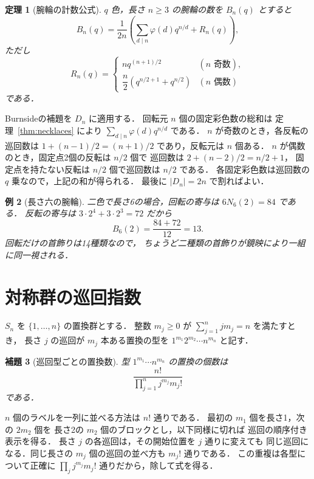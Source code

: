 \documentclass[a5paper,10pt,onecolumn]{jsarticle}
\makeatletter
\theoremstyle{mathnotetheorem}
\newtheorem{theorem}{定理}[section]
\newtheorem{lemma}[theorem]{補題}
\newtheorem{example}[theorem]{例}
\renewcommand{\proofname}{証明}
\renewenvironment{proof}[1][\proofname]{%
  \par\pushQED{\qed}\normalfont\topsep4\p@\@plus2\p@\relax
  \trivlist\item[\hskip\labelsep\bfseries #1]\ignorespaces
}{\popQED\endtrivlist\@endpefalse}
\makeatother
\begin{document}
\begin{theorem}[腕輪の計数公式]\label{thm:bracelets}
$q$ 色，長さ $n\ge3$ の腕輪の数を $B_n(q)$ とすると
\[
 B_n(q)=\frac1{2n}\left(
 \sum_{d\mid n}\varphi(d)q^{n/d}+R_n(q)\right),
\]
ただし
\[
 R_n(q)=\begin{cases}
 nq^{(n+1)/2}& (n\text{ 奇数}),\\
 \dfrac n2\left(q^{n/2+1}+q^{n/2}\right)
 &(n\text{ 偶数})
 \end{cases}
\]
である．
\end{theorem}
\begin{proof}
Burnsideの補題を $D_n$ に適用する．
回転元 $n$ 個の固定彩色数の総和は
定理~\ref{thm:necklaces} により
$\sum_{d\mid n}\varphi(d)q^{n/d}$ である．
$n$ が奇数のとき，各反転の巡回数は
$1+(n-1)/2=(n+1)/2$ であり，反転元は $n$ 個ある．
$n$ が偶数のとき，固定点2個の反転は $n/2$ 個で
巡回数は $2+(n-2)/2=n/2+1$，
固定点を持たない反転は $n/2$ 個で巡回数は $n/2$ である．
各固定彩色数は巡回数の $q$ 乗なので，上記の和が得られる．
最後に $|D_n|=2n$ で割ればよい．
\end{proof}

\begin{example}[長さ六の腕輪]
二色で長さ6の場合，回転の寄与は $6N_6(2)=84$ である．
反転の寄与は
$3\cdot2^4+3\cdot2^3=72$ だから
\[
 B_6(2)=\frac{84+72}{12}=13.
\]
回転だけの首飾りは14種類なので，
ちょうど二種類の首飾りが鏡映により一組に同一視される．
\end{example}

\section{対称群の巡回指数}
$S_n$ を $\{1,\ldots,n\}$ の置換群とする．
整数 $m_j\ge0$ が $\sum_{j=1}^n j m_j=n$ を満たすとき，
長さ $j$ の巡回が $m_j$ 本ある置換の型を
$1^{m_1}2^{m_2}\cdots n^{m_n}$ と記す．

\begin{lemma}[巡回型ごとの置換数]\label{lem:cycletypes}
型 $1^{m_1}\cdots n^{m_n}$ の置換の個数は
\begin{equation}\label{eq:permutationcount}
 \frac{n!}{\prod_{j=1}^n j^{m_j}m_j!}
\end{equation}
である．
\end{lemma}
\begin{proof}
$n$ 個のラベルを一列に並べる方法は $n!$ 通りである．
最初の $m_1$ 個を長さ1，次の $2m_2$ 個を
長さ2の $m_2$ 個のブロックとし，以下同様に切れば
巡回の順序付き表示を得る．
長さ $j$ の各巡回は，その開始位置を $j$ 通りに変えても
同じ巡回になる．同じ長さの $m_j$ 個の巡回の並べ方も
$m_j!$ 通りである．
この重複は各型について正確に
$\prod_j j^{m_j}m_j!$ 通りだから，除して式を得る．
\end{proof}
\end{document}
